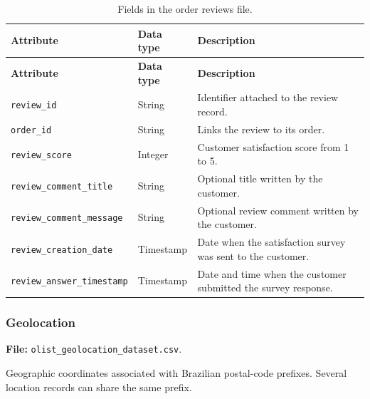 \documentclass[a4paper,12pt]{article}
\newcommand{\tablestyle}{%
  \small\setstretch{1.05}%
  \renewcommand{\arraystretch}{1.25}%
  \setlength{\extrarowheight}{3pt}%
  \arrayrulecolor{tableborder}%
}
\begin{document}
{\tablestyle
\begin{longtable}{|L{5.7cm}|L{2.1cm}|L{\dimexpr\textwidth-7.8cm-6\arrayrulewidth\relax}|}
  \caption{Fields in the order reviews file.}
  \label{tab:dataset-7}\\
  \hline
  \textbf{Attribute} & \textbf{Data type} & \textbf{Description} \\[3pt]\hline
  \endfirsthead
  \hline
  \textbf{Attribute} & \textbf{Data type} & \textbf{Description} \\[3pt]\hline
  \endhead
  \endfoot
  \endlastfoot
  \nolinkurl{review_id} & String & Identifier attached to the review record. \\[3pt]\hline
  \nolinkurl{order_id} & String & Links the review to its order. \\[3pt]\hline
  \nolinkurl{review_score} & Integer & Customer satisfaction score from 1 to 5. \\[3pt]\hline
  \nolinkurl{review_comment_title} & String & Optional title written by the customer. \\[3pt]\hline
  \nolinkurl{review_comment_message} & String & Optional review comment written by the customer. \\[3pt]\hline
  \nolinkurl{review_creation_date} & Timestamp & Date when the satisfaction survey was sent to the customer. \\[3pt]\hline
  \nolinkurl{review_answer_timestamp} & Timestamp & Date and time when the customer submitted the survey response. \\[3pt]\hline
\end{longtable}
}

\subsubsection{Geolocation}

\textbf{File:} \nolinkurl{olist_geolocation_dataset.csv}.

Geographic coordinates associated with Brazilian postal-code prefixes. Several location records can share the same prefix.
\end{document}
